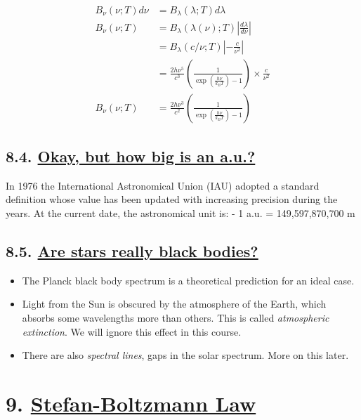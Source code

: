 \documentclass[
  letterpaper,
  DIV=11,
  numbers=noendperiod]{scrreprt}
\providecommand{\tightlist}{%
  \setlength{\itemsep}{0pt}\setlength{\parskip}{0pt}}\usepackage{longtable,booktabs,array}
\begin{document}
\begin{align}
B_\nu(\nu;T)d\nu &= B_\lambda(\lambda;T)d\lambda \\
B_\nu(\nu;T) &= B_\lambda(\lambda(\nu);T) \left|\frac{d\lambda}{d\nu}\right| \\
 &= B_\lambda(c/\nu; T) \left|-\frac{c}{\nu^2}\right| \\
  &= \frac{2h\nu^5}{c^3}\left( \frac{1}{\exp\left(\frac{h\nu}{k_BT}\right)-1} \right) \times \frac{c}{\nu^2} \\
  B_\nu(\nu;T) &= \frac{2h\nu^3}{c^2}\left( \frac{1}{\exp\left(\frac{h\nu}{k_BT}\right)-1}\right)
\end{align}

\hypertarget{okay-but-how-big-is-an-a.u.}{%
\section{\texorpdfstring{8.4. \protect\hyperlink{toc0_}{Okay, but how
big is an
a.u.?}}{8.4. Okay, but how big is an a.u.?}}\label{okay-but-how-big-is-an-a.u.}}

In 1976 the International Astronomical Union (IAU) adopted a standard
definition whose value has been updated with increasing precision during
the years. At the current date, the astronomical unit is: - 1 a.u. =
149,597,870,700 m

\hypertarget{are-stars-really-black-bodies}{%
\section{\texorpdfstring{8.5. \protect\hyperlink{toc0_}{Are stars really
black
bodies?}}{8.5. Are stars really black bodies?}}\label{are-stars-really-black-bodies}}

\begin{itemize}
\tightlist
\item
  The Planck black body spectrum is a theoretical prediction for an
  ideal case.
\item
  Light from the Sun is obscured by the atmosphere of the Earth, which
  absorbs some wavelengths more than others. This is called
  \emph{atmospheric extinction}. We will ignore this effect in this
  course.
\item
  There are also \emph{spectral lines}, gaps in the solar spectrum. More
  on this later.
\end{itemize}

\hypertarget{stefan-boltzmann-law}{%
\chapter{\texorpdfstring{9. \protect\hyperlink{toc0_}{Stefan-Boltzmann
Law}}{9. Stefan-Boltzmann Law}}\label{stefan-boltzmann-law}}
\end{document}
